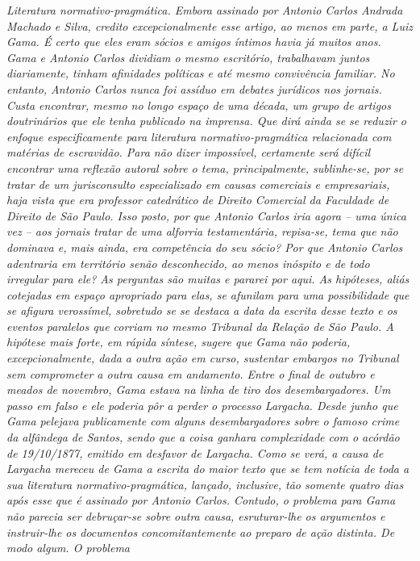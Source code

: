 \emph{Literatura normativo-pragmática. Embora assinado por Antonio
Carlos Andrada Machado e Silva, credito excepcionalmente esse artigo, ao
menos em parte, a Luiz Gama. É certo que eles eram sócios e amigos
íntimos havia já muitos anos. Gama e Antonio Carlos dividiam o mesmo
escritório, trabalhavam juntos diariamente, tinham afinidades políticas
e até mesmo convivência familiar. No entanto, Antonio Carlos nunca foi
assíduo em debates jurídicos nos jornais. Custa encontrar, mesmo no
longo espaço de uma década, um grupo de artigos doutrinários que ele
tenha publicado na imprensa. Que dirá ainda se se reduzir o enfoque
especificamente para literatura normativo-pragmática relacionada com
matérias de escravidão. Para não dizer impossível, certamente será
difícil encontrar uma reflexão autoral sobre o tema, principalmente,
sublinhe-se, por se tratar de um jurisconsulto especializado em causas
comerciais e empresariais, haja vista que era professor catedrático de
Direito Comercial da Faculdade de Direito de São Paulo. Isso posto, por
que Antonio Carlos iria agora -- uma única vez -- aos jornais tratar de
uma alforria testamentária, repisa-se, tema que não dominava e, mais
ainda, era competência do seu sócio? Por que Antonio Carlos adentraria
em território senão desconhecido, ao menos inóspito e de todo irregular
para ele? As perguntas são muitas e pararei por aqui. As hipóteses,
aliás cotejadas em espaço apropriado para elas, se afunilam para uma
possibilidade que se afigura verossímel, sobretudo se se destaca a data
da escrita desse texto e os eventos paralelos que corriam no mesmo
Tribunal da Relação de São Paulo. A hipótese mais forte, em rápida
síntese, sugere que Gama não poderia, excepcionalmente, dada a outra
ação em curso, sustentar embargos no Tribunal sem comprometer a outra
causa em andamento. Entre o final de outubro e meados de novembro, Gama
estava na linha de tiro dos desembargadores. Um passo em falso e ele
poderia pôr a perder o processo Largacha. Desde junho que Gama pelejava
publicamente com alguns desembargadores sobre o famoso crime da
alfândega de Santos, sendo que a coisa ganhara complexidade com o
acórdão de 19/10/1877, emitido em desfavor de Largacha. Como se verá, a
causa de Largacha mereceu de Gama a escrita do maior texto que se tem
notícia de toda a sua literatura normativo-pragmática, lançado,
inclusive, tão somente quatro dias após esse que é assinado por Antonio
Carlos. Contudo, o problema para Gama não parecia ser debruçar-se sobre
outra causa, esruturar-lhe os argumentos e instruir-lhe os documentos
concomitantemente ao preparo de ação distinta. De modo algum. O problema
}
